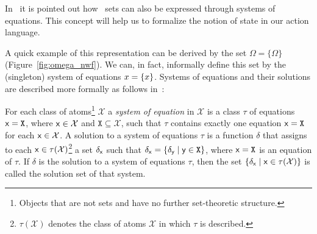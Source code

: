 	In~\cite{Aczel1989-ACZNS-2,gerbrandy1999bisimulations} it is pointed out how \nwf\ sets can also be expressed through systems of equations. 
	This concept will help us to formalize the notion of state in our action language.
	
	A quick example of this representation can be derived by the set $\Omega = \{\Omega\}$ (Figure~\ref{fig:omega_nwf}). We can, in fact, informally define this set by the (singleton) system of equations $%
	x = \bra{x}$.
	Systems of equations and their solutions are described more formally as follows in~\cite{gerbrandy1999bisimulations}:
	\begin{definition}
		For each class of atoms\footnote{Objects that are not sets and have no further set-theoretic structure.} $\mathcal{X}$ a \emph{system of equation} in $\mathcal{X}$ is a class
		$\tau$ of equations $\mathsf{x} = \mathtt{X}$, where $\mathsf{x} \in \mathcal{X}$ and $\mathtt{X} \subseteq \mathcal{X}$, such that  $\tau$ contains exactly one equation $\mathsf{x} = \mathtt{X}$ for each $\mathsf{x} \in \mathcal{X}$. 
		A solution to a system of equations $\tau$ is a function $\delta$ that assigns to each $\mathsf{x} \in \tau(\mathcal{X})$\footnote{$\tau(\mathcal{X})$ denotes the class of atoms $\mathcal{X}$ in which $\tau$ is described.} a set $\delta_{\mathsf{x}}$ such that $\delta_{\mathsf{x}} = \{ \delta_{\mathsf{y}} \mid \mathsf{y} \in \mathtt{X}\}$, where $\mathsf{x} = \mathtt{X}$ is an equation of $\tau$.
		If $\delta$ is the solution to a system of equations $\tau$, then the set $\{\delta_{\mathsf{x}} \mid \mathsf{x} \in \tau(\mathcal{X})\}$ is called the solution set of that system.
	\end{definition}
	

